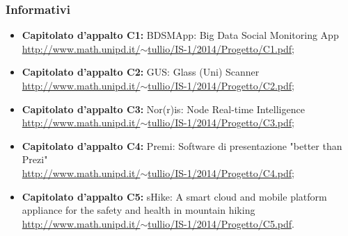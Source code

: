 \subsubsection{Informativi}
\begin{itemize}
	\item \textbf{Capitolato d’appalto C1:} BDSMApp: Big Data Social Monitoring App \\ \href{http://www.math.unipd.it/~tullio/IS-1/2014/Progetto/C1.pdf}{http://www.math.unipd.it/$\sim$tullio/IS-1/2014/Progetto/C1.pdf};
	\item \textbf{Capitolato d’appalto C2:} GUS: Glass (Uni) Scanner\\ \href{http://www.math.unipd.it/~tullio/IS-1/2014/Progetto/C2.pdf}{http://www.math.unipd.it/$\sim$tullio/IS-1/2014/Progetto/C2.pdf};
	\item \textbf{Capitolato d’appalto C3:} Nor(r)is: Node Real-time Intelligence \\ \href{http://www.math.unipd.it/~tullio/IS-1/2014/Progetto/C3.pdf}{http://www.math.unipd.it/$\sim$tullio/IS-1/2014/Progetto/C3.pdf};
	\item \textbf{Capitolato d’appalto C4:} Premi: Software di presentazione "better than Prezi"\\ \href{http://www.math.unipd.it/~tullio/IS-1/2014/Progetto/C4.pdf}{http://www.math.unipd.it/$\sim$tullio/IS-1/2014/Progetto/C4.pdf};
	\item \textbf{Capitolato d’appalto C5:} 
	sHike: A smart cloud and mobile platform appliance for the safety and health in mountain hiking\\ \href{http://www.math.unipd.it/~tullio/IS-1/2014/Progetto/C5.pdf}{http://www.math.unipd.it/$\sim$tullio/IS-1/2014/Progetto/C5.pdf}.
\end{itemize}